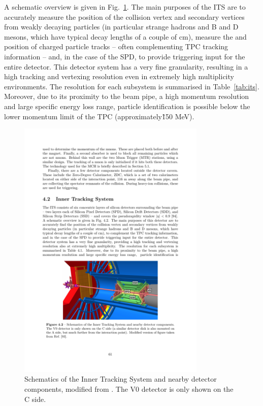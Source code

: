 A schematic overview is given in Fig.~\ref{fig:ITS}. The main purposes of the ITS are to accurately measure the position of the collision vertex and secondary vertices from weakly decaying particles (in particular strange hadrons and B and D mesons, which have typical decay lengths of a couple of cm), measure the \pt and position of charged particle tracks -- often complementing TPC tracking information -- and, in the case of the SPD, to provide triggering input for the entire detector. This detector system has a very fine granularity, resulting in a high tracking and vertexing resolution even in extremely high multiplicity environments. The resolution for each subsystem is summarised in Table~\ref{tab:its}. Moreover, due to its proximity to the beam pipe, a high momentum resolution and large specific energy loss range, particle identification is possible below the lower momentum limit of the TPC (approximately\~ 150 MeV).

\begin{figure}[htpb]
  \centering
  \includegraphics[width=0.8\textwidth]{Experimental_Aparatus/ITS.pdf}
  \caption{Schematics of the Inner Tracking System and nearby detector components, modified from \cite{Tauro:2263642}. The V0 detector is only shown on the C side.}
  \label{fig:ITS}
\end{figure}

